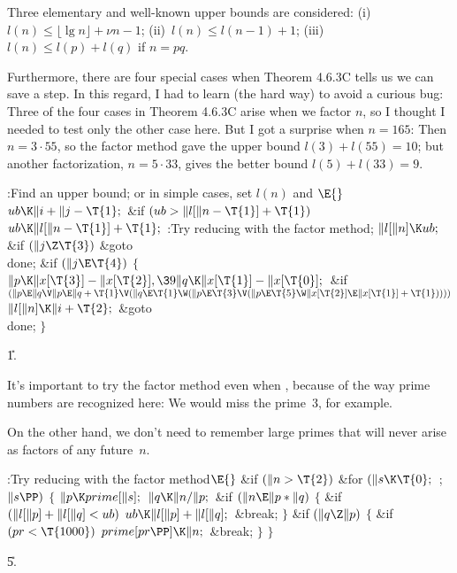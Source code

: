 Three elementary and well-known upper bounds are considered:
(i)~$l(n)\le\lfloor\lg n\rfloor+\nu n-1$;
(ii)~$l(n)\le l(n-1)+1$;
(iii)~$l(n)\le l(p)+l(q)$ if $n=pq$.

Furthermore, there are four special cases
when Theorem 4.6.3C tells us we can save a step.
In this regard, I had to learn (the hard way) to avoid a
curious bug: Three of the four cases in Theorem 4.6.3C arise
when we factor $n$, so I thought I needed to test only the
other case here. But I got a surprise when $n=165$: Then
$n=3\cdot55$, so the factor method gave the upper bound
$l(3)+l(55)=10$; but another factorization, $n=5\cdot33$,
gives the better bound $l(5)+l(33)=9$.

\Y\B\4:Find an upper bound; or in simple cases, set $l(n)$ and \X${}\E{}$\6
$\\{ub}\K\|i+\|j-\T{1};{}$\6
\&{if} ${}(\\{ub}>\|l[\|n-\T{1}]+\T{1}){}$\1\5
${}\\{ub}\K\|l[\|n-\T{1}]+\T{1};{}$\2\6
:Try reducing  with the factor method\X;\6
${}\|l[\|n]\K\\{ub};{}$\6
\&{if} ${}(\|j\Z\T{3}){}$\1\5
\&{goto} \\{done};\2\6
\&{if} ${}(\|j\E\T{4}){}$\5
${}\{{}$\1\6
${}\|p\K\|x[\T{3}]-\|x[\T{2}],\39\|q\K\|x[\T{1}]-\|x[\T{0}];{}$\6
\&{if} ${}(\|p\E\|q\V\|p\E\|q+\T{1}\V(\|q\E\T{1}\W(\|p\E\T{3}\V(\|p\E\T{5}\W%
\|x[\T{2}]\E\|x[\T{1}]+\T{1})))){}$\1\5
${}\|l[\|n]\K\|i+\T{2};{}$\2\6
\&{goto} \\{done};\6
\4${}\}{}$\2\par
\U1.\fi

It's important to try the factor method even when , because
of the way prime numbers are recognized here: We would miss the
prime~3, for example.

On the other hand, we don't need to remember large primes that will
never arise as factors of any future~$n$.

\Y\B\4:Try reducing  with the factor method\X${}\E{}$\6
\&{if} ${}(\|n>\T{2}){}$\1\6
\&{for} ${}(\|s\K\T{0};{}$  ; ${}\|s\PP){}$\5
${}\{{}$\1\6
${}\|p\K\\{prime}[\|s];{}$\6
${}\|q\K\|n/\|p;{}$\6
\&{if} ${}(\|n\E\|p*\|q){}$\5
${}\{{}$\1\6
\&{if} ${}(\|l[\|p]+\|l[\|q]<\\{ub}){}$\1\5
${}\\{ub}\K\|l[\|p]+\|l[\|q];{}$\2\6
\&{break};\6
\4${}\}{}$\2\6
\&{if} ${}(\|q\Z\|p){}$\5
${}\{{}$\1\6
\&{if} ${}(\\{pr}<\T{1000}){}$\1\5
${}\\{prime}[\\{pr}\PP]\K\|n;{}$\2\6
\&{break};\6
\4${}\}{}$\2\6
\4${}\}{}$\2\2\par
\U5.\fi

